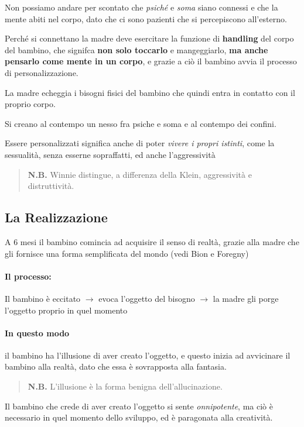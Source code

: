 \documentclass[12pt, a4paper]{article}
\begin{document}
Non possiamo andare per scontato che \emph{psich\'e} e \emph{soma} siano connessi e che la mente abiti nel corpo, dato che ci sono pazienti che si percepiscono all'esterno.

Perch\'e si connettano la madre deve esercitare la funzione di \textbf{handling} del corpo del bambino, che signifca \textbf{non solo toccarlo} e mangeggiarlo, \textbf{ma anche pensarlo come mente in un corpo}, e grazie a ciò il bambino avvia il processo di personalizzazione.

La madre echeggia i bisogni fisici del bambino che quindi entra in contatto con il proprio corpo.

Si creano al contempo un nesso fra psiche e soma e al contempo dei confini.

Essere personalizzati significa anche di poter \emph{vivere i propri istinti}, come la sessualit\`a, senza esserne sopraffatti, ed anche l'aggressivit\`a

\begin{quote}
    \textbf{N.B.} Winnie distingue, a differenza della Klein, aggressivit\`a e distruttivit\`a.
\end{quote}

\subsection{La Realizzazione}

A 6 mesi il bambino comincia ad acquisire il senso di realt\`a, grazie alla madre che gli fornisce una forma semplificata del mondo (vedi Bion e Foregny)

\paragraph{Il processo:} Il bambino \`e eccitato $\rightarrow$ evoca l'oggetto del bisogno $\rightarrow$ la madre gli porge l'oggetto proprio in quel momento

\paragraph{In questo modo} il bambino ha l'illusione di aver creato l'oggetto, e questo inizia ad avvicinare il bambino alla realt\`a, dato che essa \`e sovrapposta alla fantasia.


\begin{quote}
    \textbf{N.B.} L'illusione \`e la forma benigna dell'allucinazione.
\end{quote}
Il bambino che crede di aver creato l'oggetto si sente \emph{onnipotente}, ma ciò \`e necessario in quel momento dello sviluppo, ed \`e paragonata alla creativit\`a.
\end{document}

